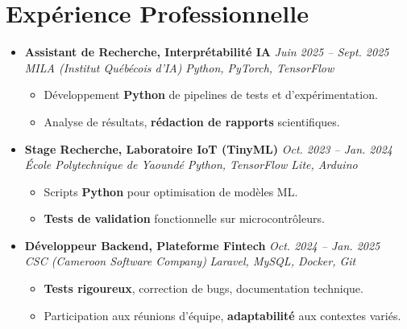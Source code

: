 \documentclass[a4paper,11pt]{article}
\begin{document}
\section{Expérience Professionnelle}
\begin{itemize}[leftmargin=*, label={-}]

\item \textbf{Assistant de Recherche, Interprétabilité IA} \hfill \textit{Juin 2025 -- Sept. 2025} \\
\textit{MILA (Institut Québécois d'IA)} \hfill \textit{Python, PyTorch, TensorFlow}
\vspace{-2pt}
    \begin{itemize}[leftmargin=0.4cm, nosep, label=\tiny$\bullet$]
        \item \small{Développement \textbf{Python} de pipelines de tests et d'expérimentation.}
        \item \small{Analyse de résultats, \textbf{rédaction de rapports} scientifiques.}
    \end{itemize}
\vspace{3pt}

\item \textbf{Stage Recherche, Laboratoire IoT (TinyML)} \hfill \textit{Oct. 2023 -- Jan. 2024} \\
\textit{École Polytechnique de Yaoundé} \hfill \textit{Python, TensorFlow Lite, Arduino}
\vspace{-2pt}
    \begin{itemize}[leftmargin=0.4cm, nosep, label=\tiny$\bullet$]
        \item \small{Scripts \textbf{Python} pour optimisation de modèles ML.}
        \item \small{\textbf{Tests de validation} fonctionnelle sur microcontrôleurs.}
    \end{itemize}
\vspace{3pt}

\item \textbf{Développeur Backend, Plateforme Fintech} \hfill \textit{Oct. 2024 -- Jan. 2025} \\
\textit{CSC (Cameroon Software Company)} \hfill \textit{Laravel, MySQL, Docker, Git}
\vspace{-2pt}
    \begin{itemize}[leftmargin=0.4cm, nosep, label=\tiny$\bullet$]
        \item \small{\textbf{Tests rigoureux}, correction de bugs, documentation technique.}
        \item \small{Participation aux réunions d'équipe, \textbf{adaptabilité} aux contextes variés.}
    \end{itemize}

\end{itemize}
\end{document}
